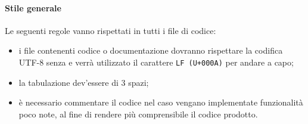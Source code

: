 		\paragraph{Stile generale}
		Le seguenti regole vanno rispettati in tutti i file di codice:
		\begin{itemize}			
			\item i file contenenti codice o documentazione dovranno rispettare la codifica UTF-8 senza  e verrà utilizzato il carattere \texttt{LF (U+000A)} per andare a capo;
			\item la tabulazione dev'essere di 3 spazi;
			\item è necessario commentare il codice nel caso vengano implementate funzionalità poco note, al fine di rendere più comprensibile il codice prodotto.
		\end{itemize}

			